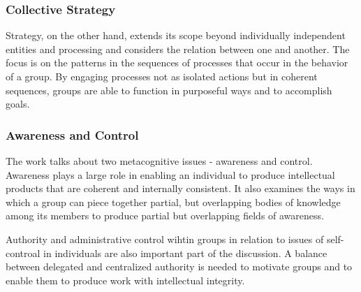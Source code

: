 \subsubsection{Collective Strategy}
Strategy, on the other hand, extends its scope beyond individually independent entities and processing and considers the relation between one and another. The focus is on the patterns in the sequences of processes that occur in the behavior of a group. By engaging processes not as isolated actions but in coherent sequences, groups are able to function in purposeful ways and to accomplish goals.

\subsubsection{Awareness and Control}
The work talks about two metacognitive issues - awareness and control. Awareness plays a large role in enabling an individual to produce intellectual products that are coherent and internally consistent. It also examines the ways in which a group can piece together partial, but overlapping bodies of knowledge among its members to produce partial but overlapping fields of awareness.

Authority and administrative control wihtin groups in relation to issues of self-controal in individuals are also important part of the discussion. A balance between delegated and centralized authority is needed to motivate groups and to enable them to produce work with intellectual integrity.
























